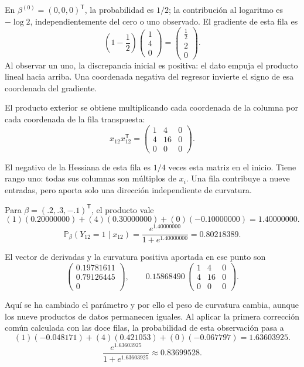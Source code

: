 \documentclass[11pt,a4paper]{article}
\newcommand{\Prob}{\mathbb P}
\newcommand{\T}{^{\mathsf T}}
\begin{document}
En \(\beta^{(0)}=(0,0,0)\T\), la probabilidad es \(1/2\);
la contribución al logaritmo es \(-\log2\), independientemente
del cero o uno observado. El gradiente de esta fila es
\[
\left(1-\frac12\right)\begin{pmatrix}1\\4\\0\end{pmatrix}=\begin{pmatrix}\frac{1}{2}\\2\\0\end{pmatrix}.
\]
Al observar un uno, la discrepancia inicial es positiva: el dato empuja el producto lineal hacia arriba. Una coordenada negativa del regresor invierte el signo de esa coordenada del gradiente.

El producto exterior se obtiene multiplicando cada coordenada
de la columna por cada coordenada de la fila transpuesta:
\[
x_{12}x_{12}\T=\begin{pmatrix}1&4&0\\4&16&0\\0&0&0\end{pmatrix}.
\]

El negativo de la Hessiana de esta fila es \(1/4\)
veces esta matriz en el inicio. Tiene rango uno:
todas sus columnas son múltiplos de \(x_i\).
Una fila contribuye a nueve entradas, pero aporta
solo una dirección independiente de curvatura.

Para \(\beta=(.2,.3,-.1)\T\), el producto vale
\[
(1)(0.20000000)+(4)(0.30000000)+(0)(-0.10000000)=1.40000000.
\]
\[
\Prob_\beta(Y_{12}=1\mid x_{12})=\frac{e^{1.40000000}}{1+e^{1.40000000}}=0.80218389.
\]

El vector de derivadas y la curvatura positiva aportada
en ese punto son
\[
\begin{pmatrix}0.19781611\\0.79126445\\0\end{pmatrix},\qquad 0.15868490\,\begin{pmatrix}1&4&0\\4&16&0\\0&0&0\end{pmatrix}.
\]

Aquí se ha cambiado el parámetro y por ello el peso de
curvatura cambia, aunque los nueve productos de datos
permanecen iguales.
Al aplicar la primera corrección común calculada con las doce filas,
la probabilidad de esta observación pasa a
\[
(1)(-0.048171)+(4)(0.421053)+(0)(-0.067797)=1.63603925.
\]
\[
\frac{e^{1.63603925}}{1+e^{1.63603925}}\approx0.83699528.
\]
\end{document}
